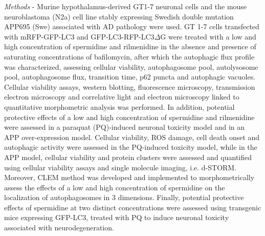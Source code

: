 \textit{Methods} - Murine hypothalamus-derived GT1-7 neuronal cells and the mouse neuroblastoma (N2a) cell line stably expressing Swedish  double mutation APP695 (Swe) associated with AD pathology were used. GT 1-7 cells transfected with mRFP-GFP-LC3 and GFP-LC3-RFP-LC3$\Delta$G were treated with a low and high concentration of spermidine and rilmenidine in the absence and presence of saturating concentrations of bafilomycin, after which the autophagic flux profile was characterized, assessing cellular viability, autophagosome pool, autolysosome pool, autophagosome flux, transition time, p62 puncta and autophagic vacuoles. Cellular viability assays, western blotting, fluorescence microscopy, transmission electron microscopy and correlative light and electron microscopy linked to quantitative morphometric analysis was performed. In addition, potential protective effects of a low and high concentration of spermidine and rilmenidine were assessed in a paraquat (PQ)-induced neuronal toxicity model and in an APP over-expression model. Cellular viability, ROS damage, cell death onset and autophagic activity were assessed in the PQ-induced toxicity model, while in the APP model, cellular viability and protein clusters were assessed and quantified using cellular viability assays and single molecule imaging, i.e. d-STORM. Moreover, CLEM method was developed and implemented to morphometrically assess the effects of a low and high concentration of spermidine on the localization of autophagosomes in 3 dimensions. Finally, potential protective effects of spermidine at two distinct concentrations were assessed using transgenic mice expressing GFP-LC3, treated with PQ to induce neuronal toxicity associated with neurodegeneration.

